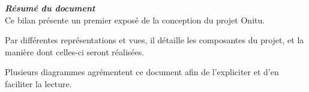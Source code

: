 \thispagestyle{empty}
\vspace*{10mm}

\textbf{\emph{\textcolor{epiBlue}{\large{Résumé du document} } } }\\

Ce bilan présente un premier exposé de la conception du projet Onitu.

Par différentes représentations et vues, il détaille les composantes du projet, et la manière dont celles-ci seront réalisées.

Plusieurs diagrammes agrémentent ce document afin de l'expliciter et d'en faciliter la lecture.

\newpage

